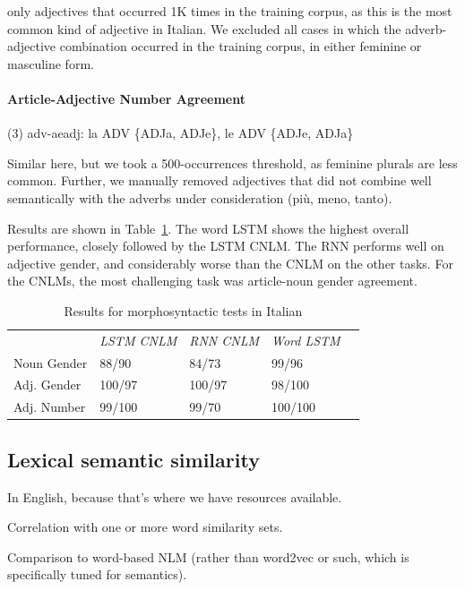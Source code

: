 only adjectives that occurred 1K times in the training corpus, as this is the most common kind of adjective in Italian.
We excluded all cases in which the adverb-adjective combination occurred in the training corpus, in either feminine or masculine form.

\paragraph{Article-Adjective Number Agreement}
(3) adv-aeadj: la ADV \{ADJa, ADJe\}, le ADV \{ADJe, ADJa\}

Similar here, but we took a 500-occurrences threshold, as feminine plurals are less common.
Further, we manually removed adjectives that did not combine well semantically with the adverbs under consideration (pi{\`u}, meno, tanto).


Results are shown in Table~\ref{tab:ital-agr-results}.
The word LSTM shows the highest overall performance, closely followed by the LSTM CNLM.
The RNN performs well on adjective gender, and considerably worse than the CNLM on the other tasks.
For the CNLMs, the most challenging task was article-noun gender agreement.



\begin{table}[t]
  \begin{center}
    \begin{tabular}{l|l|l|l|l}
      \multicolumn{1}{c}{}&\emph{LSTM CNLM}&\emph{RNN CNLM}&\emph{Word LSTM}\\
	    Noun Gender & 88/90  & 84/73 & 99/96 \\
	    Adj. Gender & 100/97 & 100/97 & 98/100 \\
	    Adj. Number & 99/100 & 99/70 & 100/100 \\
    \end{tabular}
  \end{center}
  \caption{\label{tab:ital-agr-results} Results for morphosyntactic tests in Italian}
\end{table}





%


\subsection{Lexical semantic similarity}
\label{sec:similarity}

In English, because that's where we have resources available.

Correlation with one or more word similarity sets.

Comparison to word-based NLM (rather than word2vec or such, which is
specifically tuned for semantics).

